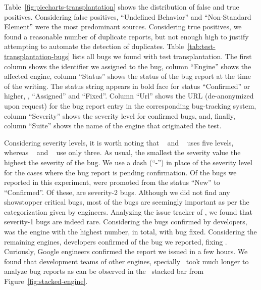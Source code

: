\documentclass[10pt,conference,anonymous]{IEEEtran}
\begin{document}





Table~\ref{fig:piecharts-transplantation} shows the distribution of
false and true positives. Considering false positives, ``Undefined
Behavior'' and ``Non-Standard Element'' were the most predominant
sources. Considering true positives, we found a reasonable number of
duplicate reports, but not enough high to justify attempting to
automate the detection of duplicates.
Table~\ref{tab:test-transplantation-bugs} lists all bugs we found with
test transplantation. The first column shows the identifier we
assigned to the bug, column ``Engine'' shows the
affected engine, column ``Status'' shows the status of the bug report
at the time of the writing. The status string appears in bold face for
status ``Confirmed'' or higher, \ie{}, ``Assigned'' and ``Fixed''.
Column ``Url'' shows the URL (de-anonymized upon request) for the bug
report entry in the corresponding bug-tracking system, column
``Severity'' shows the severity level for confirmed bugs, and,
finally, column ``Suite'' shows the name of the engine that originated
the test.



Considering severity levels, it is worth noting that \jsc{}~\cite{jsc-severity} 
and \smonkey{}~\cite{mozilla-severity} uses five levels, 
whereas \chakra{}~\cite{chakra-severity} and \veight{}~\cite{v8-severity} 
use only three. As usual, the smallest the severity value the 
highest the severity of the bug. We use a dash (``-'') 
in place of the severity level for the cases where the bug 
report is pending confirmation. Of
the  bugs we reported in this experiment,  were
promoted from the status ``New'' to ``Confirmed''. Of these, 
are severity-2 bugs.  Although we did not find any showstopper
critical bugs, most of the bugs are seemingly important as per the
categorization given by engineers. Analyzing the issue tracker of
\chakra, we found that severity-1 bugs are indeed rare. Considering
the bugs confirmed by developers, \chakra{} was the engine with the
highest number,  in total, with  bug fixed. Considering
the remaining engines, \veight{} developers confirmed  of the
 bug we reported, fixing . Curiously, Google
engineers confirmed the report we issued in a few hours. We found that
development teams of other engines, specially \jsc\, took much longer
to analyze bug reports as can be observed in the \jsc\ stacked bar
from Figure~\ref{fig:stacked-engine}.
\end{document}
